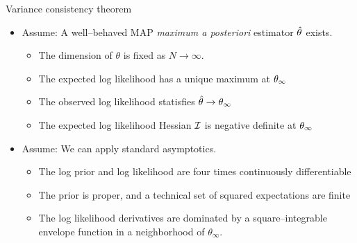 \begin{frame}[t]{Variance consistency theorem}
\pause
%
\begin{itemize}
    \item Assume: A well--behaved MAP \textit{maximum a posteriori} estimator $\hat\theta$ exists.
    \begin{itemize}
        \item The dimension of $\theta$ is fixed as $N \rightarrow \infty$.
        \item The expected log likelihood has a unique maximum at $\theta_{\infty}$
        \item The observed log likelihood statisfies $\hat\theta \rightarrow \theta_{\infty}$
        \item The expected log likelihood Hessian $\mathcal{I}$ is negative definite at $\theta_{\infty}$ 
    \end{itemize}
    \item Assume: We can apply standard asymptotics.
    \begin{itemize}
    \item The log prior and log likelihood are four times continuously differentiable
    \item The prior is proper, and a technical set of squared expectations are finite
    \item The log likelihood derivatives are dominated by a square--integrable envelope function in a
          neighborhood of $\theta_\infty$.
    \end{itemize}
\end{itemize}
%
\pause



\end{frame}








